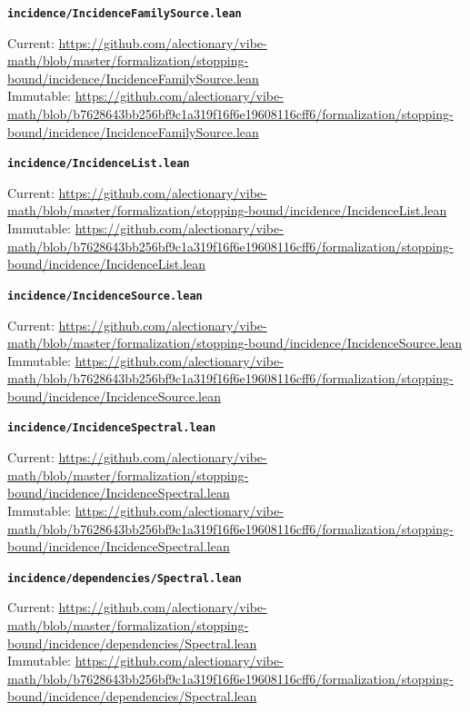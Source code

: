 \smallskip
\medskip
\par\noindent\textbf{\texttt{incidence/IncidenceFamilySource.lean}}\par\nopagebreak
{\footnotesize\noindent Current: \url{https://github.com/alectionary/vibe-math/blob/master/formalization/stopping-bound/incidence/IncidenceFamilySource.lean}\\
Immutable: \url{https://github.com/alectionary/vibe-math/blob/b7628643bb256bf9c1a319f16f6e19608116cff6/formalization/stopping-bound/incidence/IncidenceFamilySource.lean}\par}
\smallskip
\medskip
\par\noindent\textbf{\texttt{incidence/IncidenceList.lean}}\par\nopagebreak
{\footnotesize\noindent Current: \url{https://github.com/alectionary/vibe-math/blob/master/formalization/stopping-bound/incidence/IncidenceList.lean}\\
Immutable: \url{https://github.com/alectionary/vibe-math/blob/b7628643bb256bf9c1a319f16f6e19608116cff6/formalization/stopping-bound/incidence/IncidenceList.lean}\par}
\smallskip
\medskip
\par\noindent\textbf{\texttt{incidence/IncidenceSource.lean}}\par\nopagebreak
{\footnotesize\noindent Current: \url{https://github.com/alectionary/vibe-math/blob/master/formalization/stopping-bound/incidence/IncidenceSource.lean}\\
Immutable: \url{https://github.com/alectionary/vibe-math/blob/b7628643bb256bf9c1a319f16f6e19608116cff6/formalization/stopping-bound/incidence/IncidenceSource.lean}\par}
\smallskip
\medskip
\par\noindent\textbf{\texttt{incidence/IncidenceSpectral.lean}}\par\nopagebreak
{\footnotesize\noindent Current: \url{https://github.com/alectionary/vibe-math/blob/master/formalization/stopping-bound/incidence/IncidenceSpectral.lean}\\
Immutable: \url{https://github.com/alectionary/vibe-math/blob/b7628643bb256bf9c1a319f16f6e19608116cff6/formalization/stopping-bound/incidence/IncidenceSpectral.lean}\par}
\smallskip
\medskip
\par\noindent\textbf{\texttt{incidence/dependencies/Spectral.lean}}\par\nopagebreak
{\footnotesize\noindent Current: \url{https://github.com/alectionary/vibe-math/blob/master/formalization/stopping-bound/incidence/dependencies/Spectral.lean}\\
Immutable: \url{https://github.com/alectionary/vibe-math/blob/b7628643bb256bf9c1a319f16f6e19608116cff6/formalization/stopping-bound/incidence/dependencies/Spectral.lean}\par}
